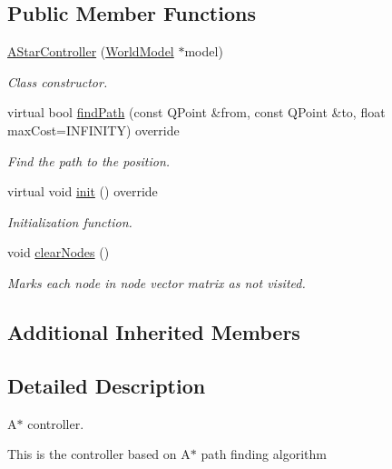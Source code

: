 \subsection*{Public Member Functions}
\begin{DoxyCompactItemize}
\item 
\hyperlink{classAStarController_a098891ef3d828d56392e2e2ff48153b1}{A\+Star\+Controller} (\hyperlink{classWorldModel}{World\+Model} $\ast$model)
\begin{DoxyCompactList}\small\item\em Class constructor. \end{DoxyCompactList}\item 
virtual bool \hyperlink{classAStarController_aa230f8e80731d01daa502af943fe350e}{find\+Path} (const Q\+Point \&from, const Q\+Point \&to, float max\+Cost=I\+N\+F\+I\+N\+I\+TY) override
\begin{DoxyCompactList}\small\item\em Find the path to the position. \end{DoxyCompactList}\item 
virtual void \hyperlink{classAStarController_a228a9bd549dbae704ed6663ed726053e}{init} () override
\begin{DoxyCompactList}\small\item\em Initialization function. \end{DoxyCompactList}\item 
void \hyperlink{classAStarController_a002505340b1518995d830bc93e0ffd3d}{clear\+Nodes} ()\hypertarget{classAStarController_a002505340b1518995d830bc93e0ffd3d}{}\label{classAStarController_a002505340b1518995d830bc93e0ffd3d}

\begin{DoxyCompactList}\small\item\em Marks each node in node vector matrix as not visited. \end{DoxyCompactList}\end{DoxyCompactItemize}
\subsection*{Additional Inherited Members}


\subsection{Detailed Description}
A$\ast$ controller. 

This is the controller based on A$\ast$ path finding algorithm 

